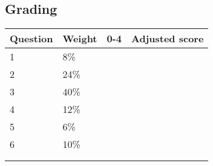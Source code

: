 \documentclass[a4paper,12pt]{book}
\begin{document}
    \hrulefill

    \subsection*{Grading}

    \begin{center}

        \begin{tabular}{ | l | l | l | l | }
            \hline
            \textbf{ Question } & \textbf{ Weight } & \textbf{ 0-4 } & \textbf{ Adjusted score }
            \\ \hline{}

            1 & 8\% & &    \\ \hline
            2 & 24\% & &    \\ \hline
            3 & 40\% & &    \\ \hline
            4 & 12\% & &    \\ \hline
            5 & 6\% & &    \\ \hline
            6 & 10\% & &    \\ \hline
            & & & \\ \hline
            & & & \\ \hline


        \end{tabular}
    \end{center}
\end{document}
